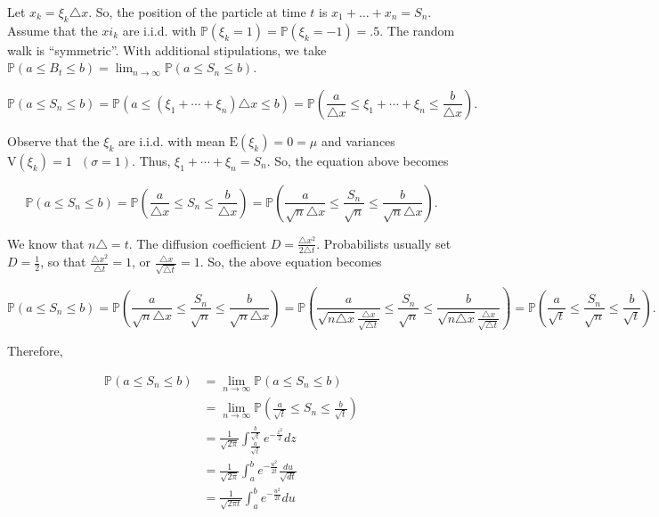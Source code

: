 \documentclass[12pt]{article}
\newcommand{\prob}[1]{\mathbb{P}(#1)}
\newcommand{\expected}[1]{\text{E}(#1)}
\newcommand{\variance}[1]{\text{V}(#1)}
\begin{document}
\noindent
Let $x_k = \xi_k \triangle x$. So, the position of the particle at time $t$ is $x_1 + \ldots + x_n = S_n$. Assume that the $xi_k$ are i.i.d. with $\prob{\xi_k = 1} = \prob{\xi_k = -1} = .5$. The random walk is ``symmetric''. With additional stipulations, we take $\prob{a \leq B_t \leq b} = \lim_{n \rightarrow \infty} \prob{a \leq S_n \leq b}$.

\begin{equation*}
\prob{a \leq S_n \leq b} = \prob{a \leq (\xi_1 + \cdots + \xi_n) \triangle x \leq b} = \prob{\frac{a}{\triangle x} \leq \xi_1 + \cdots + \xi_n \leq \frac{b}{\triangle x}}.
\end{equation*}

\noindent
Observe that the $\xi_k$ are i.i.d. with mean $\expected{\xi_k} = 0 = \mu$ and variances $\variance{\xi_k} = 1 \text{ } (\sigma = 1)$. Thus, $\xi_1 + \cdots + \xi_n = S_n$. So, the equation above becomes 

\begin{equation*}
\prob{a \leq S_n \leq b} = \prob{\frac{a}{\triangle x} \leq S_n \leq \frac{b}{\triangle x}} = \prob{\frac{a}{\sqrt{n} \triangle x} \leq \frac{S_n}{\sqrt{n}} \leq \frac{b}{\sqrt{n} \triangle x}}.
\end{equation*}

\vspace*{.5cm}
\noindent
We know that $n \triangle = t$. The diffusion coefficient $D = \frac{\triangle x^2}{2 \triangle t}$. Probabilists usually set $D = \frac{1}{2}$, so that $\frac{\triangle x^2}{\triangle t} = 1$, or $\frac{\triangle x}{\sqrt{ \triangle t}} = 1$. So, the above equation becomes 

\begin{equation*}
\prob{a \leq S_n \leq b} = \prob{\frac{a}{\sqrt{n} \triangle x} \leq \frac{S_n}{\sqrt{n}} \leq \frac{b}{\sqrt{n} \triangle x}} = \prob{\frac{a}{\sqrt{n \triangle x} \frac{\triangle x}{\sqrt{\triangle t}}} \leq \frac{S_n}{\sqrt{n}} \leq \frac{b}{\sqrt{n \triangle x} \frac{\triangle x}{\sqrt{\triangle t}}}} = \prob{\frac{a}{\sqrt{t}} \leq \frac{S_n}{\sqrt{n}} \leq \frac{b}{\sqrt{t}}}. 
\end{equation*}

\noindent
Therefore, 

\begin{align*}
\prob{a \leq S_n \leq b} &= \lim_{n \rightarrow \infty} \prob{a \leq S_n \leq b} \\
&= \lim_{n \rightarrow \infty} \prob{\frac{a}{\sqrt{t}} \leq S_n \leq \frac{b}{\sqrt{t}} } \\
&= \frac{1}{\sqrt{2 \pi}} \int_{\frac{a}{\sqrt{t}}}^{\frac{b}{\sqrt{t}}} e^{- \frac{z^2}{2}} dz\\
&= \frac{1}{\sqrt{2 \pi}} \int_{a}^{b} e^{- \frac{u^2}{2t}} \frac{du}{\sqrt{dt}}\\
&= \frac{1}{\sqrt{2 \pi t}} \int_{a}^{b} e^{- \frac{u^2}{2t}} du
\end{align*}
\end{document}
